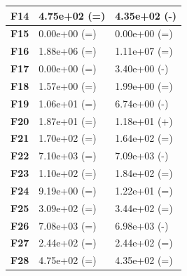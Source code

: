 \documentclass[12pt,a4paper]{report}
\begin{document}
{{{{{{\begin{table}[]
\begin{tabular}{|l|l|l|}
{\bf F14} & 4.75e+02 (=)        & 4.35e+02 (-) \\ \hline
{\bf F15} & 0.00e+00 (=)        & 0.00e+00 (=) \\ \hline
{\bf F16} & 1.88e+06 (=)        & 1.11e+07 (=) \\ \hline
{\bf F17} & 0.00e+00 (=)        & 3.40e+00 (-) \\ \hline
{\bf F18} & 1.57e+00 (=)        & 1.99e+00 (=) \\ \hline
{\bf F19} & 1.06e+01 (=)        & 6.74e+00 (-) \\ \hline
{\bf F20} & 1.87e+01 (=)        & 1.18e+01 (+) \\ \hline
{\bf F21} & 1.70e+02 (=)        & 1.64e+02 (=) \\ \hline
{\bf F22} & 7.10e+03 (=)        & 7.09e+03 (-) \\ \hline
{\bf F23} & 1.10e+02 (=)        & 1.84e+02 (=) \\ \hline
{\bf F24} & 9.19e+00 (=)        & 1.22e+01 (=) \\ \hline
{\bf F25} & 3.09e+02 (=)        & 3.44e+02 (=) \\ \hline
{\bf F26} & 7.08e+03 (=)        & 6.98e+03 (-) \\ \hline
{\bf F27} & 2.44e+02 (=)        & 2.44e+02 (=) \\ \hline
{\bf F28} & 4.75e+02 (=)        & 4.35e+02 (=) \\ \hline
\end{tabular}
\end{table}

}}}}}}
\end{document}
